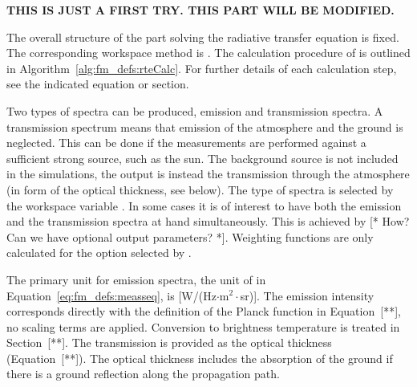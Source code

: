{\bf THIS IS JUST A FIRST TRY. THIS PART WILL BE MODIFIED.}


%
%
%
%
%
%
%


\label{sec:fm_defs:calcproc}

The overall structure of the part solving the radiative transfer
equation is fixed. The corresponding workspace method is
. The calculation procedure of  is
outlined in Algorithm~\ref{alg:fm_defs:rteCalc}. For further details
of each calculation step, see the indicated equation or section.

Two types of spectra can be produced, emission and transmission
spectra. A transmission spectrum means that emission of the atmosphere
and the ground is neglected. This can be done if the measurements are
performed against a sufficient strong source, such as the sun. The
background source is not included in the simulations, the output is
instead the transmission through the atmosphere (in form of the
optical thickness, see below). The type of spectra is selected by the
workspace variable . In some cases it is of interest
to have both the emission and the transmission spectra at hand
simultaneously. This is achieved by [* How? Can we have optional
output parameters? *]. Weighting functions are only calculated for the
option selected by .

The primary unit for emission spectra, the unit of  in
Equation~\ref{eq:fm_defs:measseq}, is [W/(Hz$\cdot$m$^2\cdot$sr)].
The emission intensity corresponds directly with the definition of the
Planck function in Equation~[**], no scaling terms are applied.
Conversion to brightness temperature is treated in Section~[**].  The
transmission is provided as the optical thickness (Equation~[**]).
The optical thickness includes the absorption of the ground if there
is a ground reflection along the propagation path.

